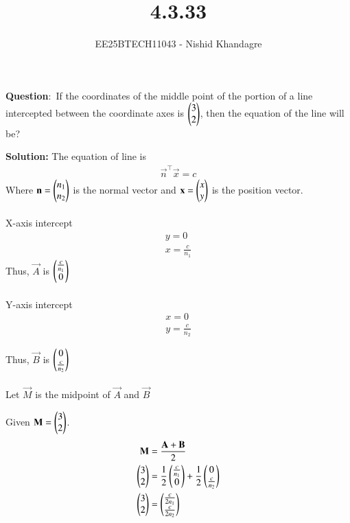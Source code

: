 \documentclass[journal]{IEEEtran}
\title{4.3.33}
\author{EE25BTECH11043 - Nishid Khandagre}
\begin{document}
\maketitle

\renewcommand{\thefigure}{\theenumi}
\renewcommand{\thetable}{\theenumi}


\textbf{Question}:\
If the coordinates of the middle point of the portion of a line intercepted between the
coordinate axes is $\begin{pmatrix}3\\2\end{pmatrix}$, then the equation of the line will be?

\textbf{Solution: }
The equation of line is
\begin{align}
\vec{n}^\top\vec{x} = c
\end{align}
Where $\mathbf{n} = \begin{pmatrix}n_1 \\ n_2\end{pmatrix}$ is the normal vector and $\mathbf{x} = \begin{pmatrix}x \\ y\end{pmatrix}$ is the position vector.\\ \\




X-axis intercept
\begin{align}
 y=0\\
x = \frac{c}{n_1}
\end{align}
Thus, $\vec{A}$ is $\begin{pmatrix}\frac{c}{n_1} \\ 0\end{pmatrix}$\\ \\


Y-axis intercept
\begin{align}
x=0\\
y = \frac{c}{n_2}
\end{align}

Thus, $\vec{B}$ is $\begin{pmatrix}0 \\ \frac{c}{n_2}\end{pmatrix}$\\ \\

Let $\vec{M}$ is the midpoint of $\vec{A}$ and $\vec{B}$

Given $\mathbf{M} = \begin{pmatrix}3 \\ 2\end{pmatrix}$.
\begin{align}
\mathbf{M} &= \frac{\mathbf{A} + \mathbf{B}}{2} \\
\begin{pmatrix}3\\2\end{pmatrix}&= \frac{1}{2} \begin{pmatrix}\frac{c}{n_1} \\ 0\end{pmatrix} + \frac{1}{2} \begin{pmatrix}0 \\ \frac{c}{n_2}\end{pmatrix} \\
\begin{pmatrix}3\\2\end{pmatrix}&= \begin{pmatrix}\frac{c}{2n_1} \\ \frac{c}{2n_2}\end{pmatrix}
\end{align}
\end{document}
